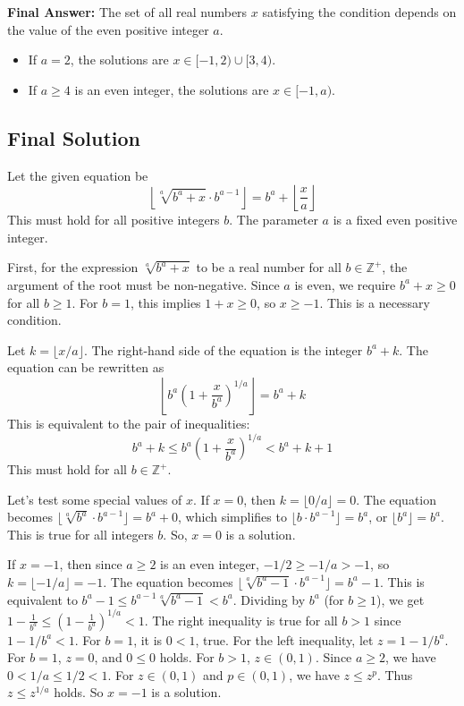 \documentclass[12pt,a4paper]{article}
\theoremstyle{definition}
\begin{document}
        \textbf{Final Answer:}
        The set of all real numbers $x$ satisfying the condition depends on the value of the even positive integer $a$.
        \begin{itemize}
            \item If $a=2$, the solutions are $x \in [-1, 2) \cup [3, 4)$.
            \item If $a \geq 4$ is an even integer, the solutions are $x \in [-1, a)$.
        \end{itemize}


    \subsection{Final Solution}
        Let the given equation be
        \[ \left\lfloor \sqrt[a]{b^a + x} \cdot b^{a-1} \right\rfloor = b^a + \left\lfloor \frac{x}{a} \right\rfloor \]
        This must hold for all positive integers $b$. The parameter $a$ is a fixed even positive integer.

        First, for the expression $\sqrt[a]{b^a + x}$ to be a real number for all $b \in \mathbb{Z}^+$, the argument of the root must be non-negative. Since $a$ is even, we require $b^a + x \geq 0$ for all $b \geq 1$. For $b=1$, this implies $1+x \geq 0$, so $x \geq -1$. This is a necessary condition.

        Let $k = \lfloor x/a \rfloor$. The right-hand side of the equation is the integer $b^a+k$.
        The equation can be rewritten as
        \[ \left\lfloor b^a \left(1 + \frac{x}{b^a}\right)^{1/a} \right\rfloor = b^a + k \]
        This is equivalent to the pair of inequalities:
        \[ b^a+k \leq b^a \left(1 + \frac{x}{b^a}\right)^{1/a} < b^a+k+1 \]
        This must hold for all $b \in \mathbb{Z}^+$.

        Let's test some special values of $x$.
        If $x=0$, then $k = \lfloor 0/a \rfloor = 0$. The equation becomes $\lfloor \sqrt[a]{b^a} \cdot b^{a-1} \rfloor = b^a+0$, which simplifies to $\lfloor b \cdot b^{a-1} \rfloor = b^a$, or $\lfloor b^a \rfloor = b^a$. This is true for all integers $b$. So, $x=0$ is a solution.

        If $x=-1$, then since $a \geq 2$ is an even integer, $-1/2 \geq -1/a > -1$, so $k = \lfloor -1/a \rfloor = -1$.
        The equation becomes $\lfloor \sqrt[a]{b^a-1} \cdot b^{a-1} \rfloor = b^a-1$.
        This is equivalent to $b^a-1 \leq b^{a-1}\sqrt[a]{b^a-1} < b^a$.
        Dividing by $b^a$ (for $b \geq 1$), we get $1 - \frac{1}{b^a} \leq \left(1-\frac{1}{b^a}\right)^{1/a} < 1$.
        The right inequality is true for all $b>1$ since $1-1/b^a < 1$. For $b=1$, it is $0 < 1$, true.
        For the left inequality, let $z = 1-1/b^a$. For $b=1$, $z=0$, and $0 \leq 0$ holds. For $b>1$, $z \in (0,1)$. Since $a \geq 2$, we have $0 < 1/a \leq 1/2 < 1$. For $z \in (0,1)$ and $p \in (0,1)$, we have $z \leq z^p$. Thus $z \leq z^{1/a}$ holds.
        So $x=-1$ is a solution.
\end{document}
